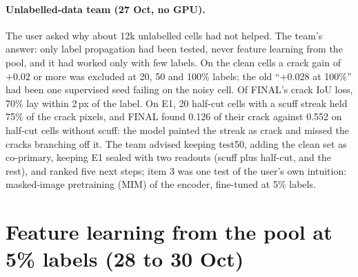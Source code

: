 \paragraph{Unlabelled-data team (27 Oct, no GPU).} The user asked why about 12k unlabelled cells had not helped. The team's answer:
only label propagation had been tested, never feature learning from the pool, and it had worked only with few labels. On the clean
cells a crack gain of $+0.02$ or more was excluded at 20, 50 and 100\% labels; the old ``$+0.028$ at 100\%'' had been one supervised
seed failing on the noisy cell. Of FINAL's crack IoU loss, 70\% lay within 2\,px of the label. On E1, 20 half-cut cells with a
scuff streak held 75\% of the crack pixels, and FINAL found 0.126 of their crack against 0.552 on half-cut cells without scuff: the
model painted the streak as crack and missed the cracks branching off it. The team advised keeping test50, adding the clean set as
co-primary, keeping E1 sealed with two readouts (scuff plus half-cut, and the rest), and ranked five next steps; item 3 was one test
of the user's own intuition: masked-image pretraining (MIM) of the encoder, fine-tuned at 5\% labels.

\section{Feature learning from the pool at 5\% labels (28 to 30 Oct)}\label{sec:midnov-features}

